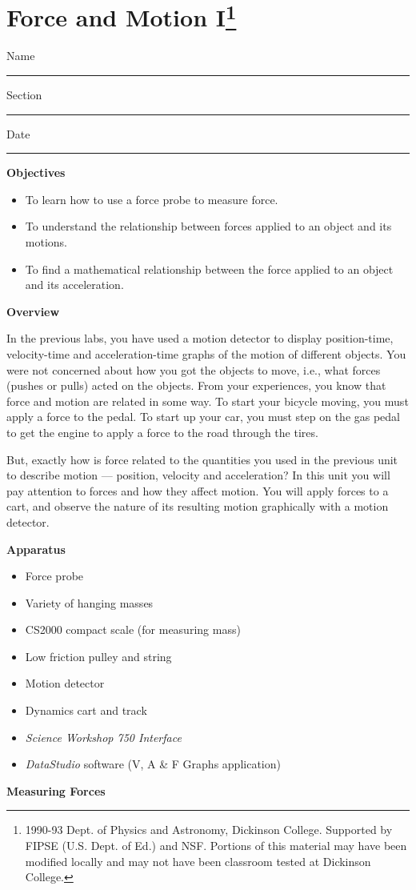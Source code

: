 
\section{Force and Motion I\footnote{
1990-93 Dept. of Physics and Astronomy, Dickinson College. Supported by FIPSE
(U.S. Dept. of Ed.) and NSF. Portions of this material may have been modified
locally and may not have been classroom tested at Dickinson College.
}}

Name \rule{2.0in}{0.1pt}\hfill{}Section \rule{1.0in}{0.1pt}\hfill{}Date \rule{1.0in}{0.1pt}

\textbf{Objectives }

\begin{itemize}
\item To learn how to use a force probe to measure force. 
\item To understand the relationship between forces applied to an object and its motions. 
\item To find a mathematical relationship between the force applied to an object and
its acceleration.
\end{itemize}
\textbf{Overview }

In the previous labs, you have used a motion detector to display position-time,
velocity-time and acceleration-time graphs of the motion of different objects.
You were not concerned about how you got the objects to move, i.e., what forces
(pushes or pulls) acted on the objects. From your experiences, you know that
force and motion are related in some way. To start your bicycle moving, you
must apply a force to the pedal. To start up your car, you must step on the
gas pedal to get the engine to apply a force to the road through the tires.

But, exactly how is force related to the quantities you used in the previous
unit to describe motion --- position, velocity and acceleration? In this unit you
will pay attention to forces and how they affect motion. You will apply forces
to a cart, and observe the nature of its resulting motion graphically with a
motion detector.

\textbf{Apparatus} 

\begin{itemize}
\item Force probe 
\item Variety of hanging masses 
\item CS2000 compact scale (for measuring mass)
\item Low friction pulley and string 
\item Motion detector 
\item Dynamics cart and track 
\item \textit{Science Workshop 750 Interface}
\item \textit{DataStudio} software (V, A \& F Graphs application)
\end{itemize}
\textbf{Measuring Forces} 

